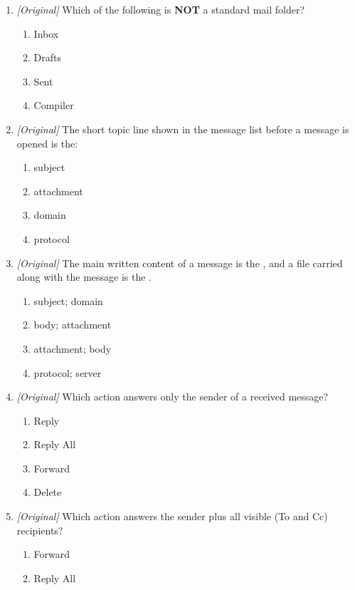 \documentclass[11pt]{article}
\begin{document}
\begin{enumerate}[label=\textbf{Q\arabic*.}, leftmargin=*]
\begin{enumerate}[label=\Alph*.]
    \item Sent folder
  \end{enumerate}
\item \textit{[Original]} Which of the following is \textbf{NOT} a standard mail folder?
  \begin{enumerate}[label=\Alph*.]
    \item Inbox
    \item Drafts
    \item Sent
    \item Compiler
  \end{enumerate}
\item \textit{[Original]} The short topic line shown in the message list before a message is opened is the:
  \begin{enumerate}[label=\Alph*.]
    \item subject
    \item attachment
    \item domain
    \item protocol
  \end{enumerate}
\item \textit{[Original]} The main written content of a message is the \underline{\hspace{2.2cm}}, and a file carried along with the message is the \underline{\hspace{2.2cm}}.
  \begin{enumerate}[label=\Alph*.]
    \item subject; domain
    \item body; attachment
    \item attachment; body
    \item protocol; server
  \end{enumerate}
\item \textit{[Original]} Which action answers only the sender of a received message?
  \begin{enumerate}[label=\Alph*.]
    \item Reply
    \item Reply All
    \item Forward
    \item Delete
  \end{enumerate}
\item \textit{[Original]} Which action answers the sender plus all visible (To and Cc) recipients?
  \begin{enumerate}[label=\Alph*.]
    \item Forward
    \item Reply All

\end{enumerate}
\end{enumerate}
\end{document}
